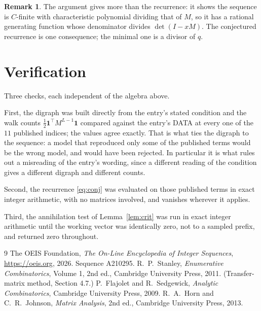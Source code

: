 \documentclass[11pt,a4paper]{article}
\theoremstyle{plain}
\theoremstyle{definition}
\newtheorem{remark}[theorem]{Remark}
\begin{document}
\begin{remark}
The argument gives more than the recurrence: it shows the sequence is $C$-finite with
characteristic polynomial dividing that of $M$, so it has a rational generating function
whose denominator divides $\det(I-xM)$. The conjectured recurrence is one consequence; the
minimal one is a divisor of $q$.
\end{remark}

\section{Verification}

Three checks, each independent of the algebra above.

First, the digraph was built directly from the entry's stated condition and the walk counts
$\tfrac1{2}\mathbf{1}^{\!\top}M^{L-1}\mathbf{1}$ compared against the entry's DATA at
every one of the $11$ published indices; the values agree exactly. That is what ties
the digraph to the sequence: a model that reproduced only some of the published terms would
be the wrong model, and would have been rejected. In particular it is what rules out a
misreading of the entry's wording, since a different reading of the condition gives a
different digraph and different counts.

Second, the recurrence \eqref{eq:conj} was evaluated on those published terms in exact
integer arithmetic, with no matrices involved, and vanishes wherever it applies.

Third, the annihilation test of Lemma~\ref{lem:crit} was run in exact integer arithmetic
until the working vector was identically zero, not to a sampled prefix, and returned zero
throughout.

\begin{thebibliography}{9}
 The OEIS Foundation, \emph{The On-Line Encyclopedia of Integer
Sequences}, \url{https://oeis.org}, 2026. Sequence A210295.
 R.~P.~Stanley, \emph{Enumerative Combinatorics}, Volume 1, 2nd ed.,
Cambridge University Press, 2011. (Transfer-matrix method, Section 4.7.)
 P.~Flajolet and R.~Sedgewick, \emph{Analytic Combinatorics}, Cambridge
University Press, 2009.
 R.~A.~Horn and C.~R.~Johnson, \emph{Matrix Analysis}, 2nd ed., Cambridge
University Press, 2013.
\end{thebibliography}
\end{document}

